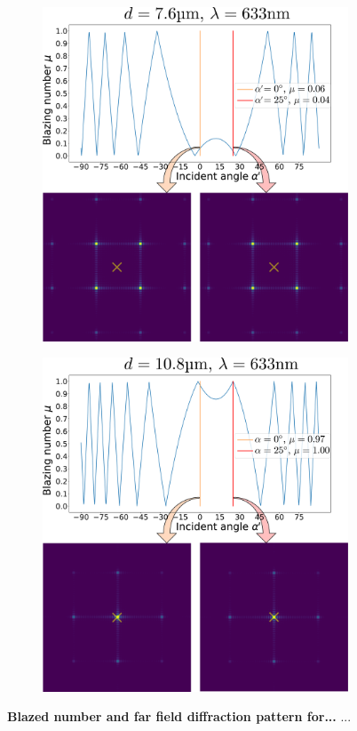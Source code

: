 \documentclass[12pt]{iopart}
\begin{document}
\begin{figure}
  \centering
  \begin{subfigure}{0.49\textwidth}
  \centering
  \includegraphics[width = \textwidth]{images/mu_76.pdf}
  \end{subfigure}
  \begin{subfigure}{0.49\textwidth}
  \centering
  \includegraphics[width = \textwidth]{images/mu_108.pdf}
  \end{subfigure}
  \caption{
  \textbf{Blazed number and far field diffraction pattern for...}
 ...
  }
  \label{fig:mu76}
\end{figure}
\end{document}
